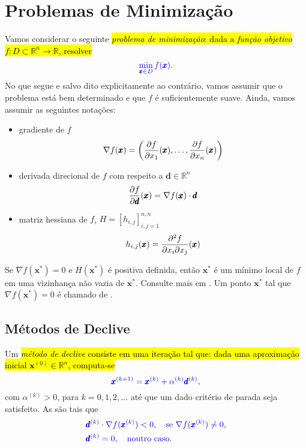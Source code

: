 \section{Problemas de Minimização}\label{cap_otimizacao_sec_minimi}
\badgeRevisar

Vamos considerar o seguinte \hl{\emph{problema de minimização}: dada a \emph{função objetivo} $f:D\subset \mathbb{R}^n\to\mathbb{R}$, resolver}
\begin{equation}\color{blue}\min_{\pmb{x}\in D} f(\pmb{x}).
\end{equation}
No que segue e salvo dito explicitamente ao contrário, vamos assumir que o problema está bem determinado e que $f$ é suficientemente suave. Ainda, vamos assumir as seguintes notações:
\begin{itemize}
\item gradiente de $f$
  \begin{equation}
    \nabla f(\pmb{x}) = \left(\frac{\partial f}{\partial x_1}(\pmb{x}),\dotsc,\frac{\partial f}{\partial x_n}(\pmb{x})\right)
  \end{equation}
\item derivada direcional de $f$ com respeito a $\pmb{d}\in\mathbb{R}^n$
  \begin{equation}
    \frac{\partial f}{\partial \pmb{d}}(\pmb{x}) = \nabla f(\pmb{x})\cdot \pmb{d}
  \end{equation}
\item matriz hessiana de $f$, $H=[h_{i,j}]_{i,j=1}^{n,n}$
  \begin{equation}
    h_{i,j}(\pmb{x}) = \frac{\partial^2 f}{\partial x_i\partial x_j}(\pmb{x})
  \end{equation}
\end{itemize}

\begin{obs}
  Se $\nabla f(\pmb{x}^*) = 0$ e $H(\pmb{x}^*)$ é positiva definida, então $\pmb{x}^*$ é um mínimo local de $f$ em uma vizinhança não vazia de $\pmb{x}^*$. Consulte mais em \cite[Seção 7.2]{Quarteroni2007a}. Um ponto $\pmb{x}^*$ tal que $\nabla f(\pmb{x}^*) = 0$ é chamado de .
\end{obs}

\subsection{Métodos de Declive}
\badgeRevisar

Um \hl{\emph{método de declive} consiste em uma iteração tal que: dada uma aproximação inicial $\pmb{x}^{(0)}\in\mathbb{R}^n$, computa-se}
\begin{equation}\color{blue}\pmb{x}^{(k+1)} = \pmb{x}^{(k)} + \alpha^{(k)} \pmb{d}^{(k)},
\end{equation}
com  $\alpha^{(k)}>0$, para $k=0,1,2,\ldots$ até que um dado critério de parada seja satisfeito. As  são tais que
\begin{align}
  &\color{blue}\pmb{d}^{(k)}\cdot\nabla f(\pmb{x}^{(k)}) < 0,\quad \text{se } \nabla f(\pmb{x}^{(k)}) \neq 0,\label{eq:condDirecoes0}\\
  &\color{blue}\pmb{d}^{(k)} = 0,\quad \text{noutro caso.}\label{eq:condDirecoes1}
\end{align}

